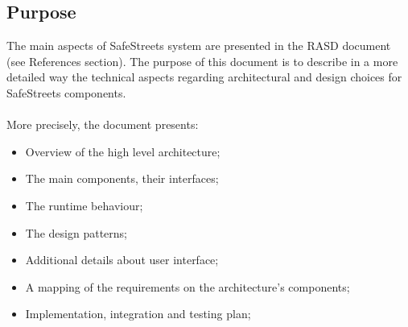 \documentclass{article}
\begin{document}
		\subsection{Purpose}
		The main aspects of SafeStreets system are presented in the RASD document (see References section). The purpose of this document is to describe in a more detailed way the technical aspects regarding architectural and design choices for SafeStreets components.\\\\
		More precisely, the document presents:
		\begin{itemize}
			\item Overview of the high level architecture;
			\item The main components, their interfaces; 
			\item The runtime behaviour; 
			\item The design patterns;
			\item Additional details about user interface;
			\item A mapping of the requirements on the architecture's components;
			\item Implementation, integration and testing plan;
		\end{itemize}
\end{document}
